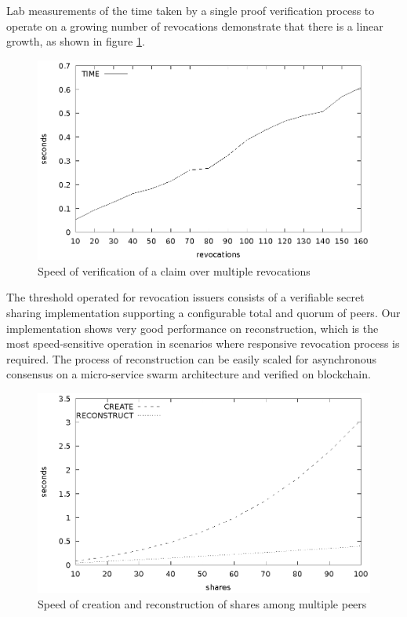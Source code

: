 Lab measurements of the time taken by a single proof verification process to operate on a growing number of revocations demonstrate that there is a linear growth, as shown in figure \ref{fig:verifyrevocations}.

\begin{figure}
    \centering
    \includegraphics[width=1\linewidth]{verifyrevocations.eps}

    \caption{Speed of verification of a claim over multiple revocations}
    \label{fig:verifyrevocations}
\end{figure}

The threshold operated for revocation issuers consists of a verifiable secret sharing implementation supporting a configurable total and quorum of peers. Our implementation shows very good performance on reconstruction, which is the most speed-sensitive operation in scenarios where responsive revocation process is required. The process of reconstruction can be easily scaled for asynchronous consensus on a micro-service swarm architecture and verified on blockchain.

\begin{figure}
    \centering
    \includegraphics[width=1\linewidth]{pvss.eps}
    \caption{Speed of creation and reconstruction of shares among multiple peers}
    \label{fig:pvss}
\end{figure}


